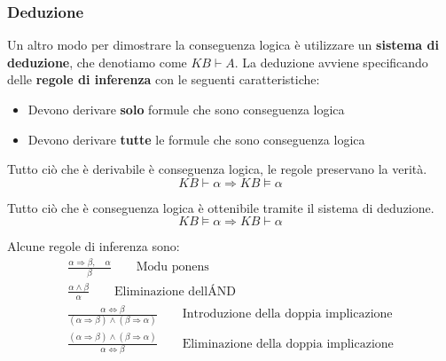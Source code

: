 \subsubsection{Deduzione}
Un altro modo per dimostrare la conseguenza logica è utilizzare un \textbf{sistema di deduzione}, che denotiamo come $KB \vdash A$. La deduzione avviene specificando delle \textbf{regole di inferenza} con le seguenti caratteristiche:
\begin{itemize}
	\item Devono derivare \textbf{solo} formule che sono conseguenza logica
	\item Devono derivare \textbf{tutte} le formule che sono conseguenza logica
\end{itemize}
\begin{definition}[Correttezza]
	Tutto ciò che è derivabile è conseguenza logica, le regole preservano la verità.
	\begin{equation}
		KB \vdash \alpha \Rightarrow KB \models \alpha
	\end{equation}
\end{definition}
\begin{definition}[Completezza]
	Tutto ciò che è conseguenza logica è ottenibile tramite il sistema di deduzione.
	\begin{equation}
		KB \models \alpha \Rightarrow KB \vdash \alpha
	\end{equation}
\end{definition}
Alcune regole di inferenza sono:
\begin{gather}
	\frac{\alpha \Rightarrow \beta, \quad \alpha}{\beta} \quad\quad\text{Modu ponens}\\
	\frac{\alpha \land \beta}{\alpha} \quad\quad\text{Eliminazione dell\'AND}\\
	\frac{\alpha \Leftrightarrow \beta}{(\alpha \Rightarrow \beta) \land (\beta \Rightarrow \alpha)} \quad\quad\text{Introduzione della doppia implicazione}\\
	\frac{(\alpha \Rightarrow \beta) \land (\beta \Rightarrow \alpha)}{\alpha \Leftrightarrow \beta} \quad\quad\text{Eliminazione della doppia implicazione}
\end{gather}

